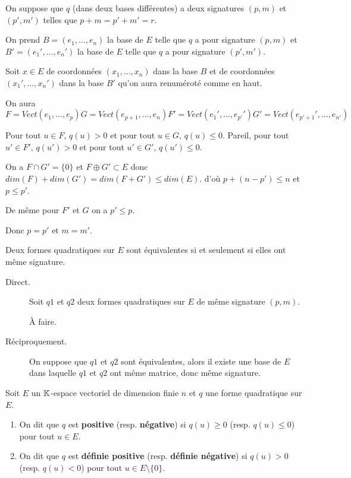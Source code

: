 \documentclass[a4paper, 12pt]{article}
\begin{document}
\begin{demonstration}
    On suppose que $q$ (dans deux bases différentes) a deux signatures $(p, m)$ et $(p', m')$ telles que $p + m = p' + m' = r$.

    On prend $B = (e_1, \ldots, e_n)$ la base de $E$ telle que $q$ a pour signature $(p, m)$ et $B' = (e_1', \ldots, e_n')$ la base de $E$ telle que $q$ a pour signature $(p', m')$.

    Soit $x \in E$ de coordonnées $(x_1, \ldots, x_n)$ dans la base $B$ et de coordonnées $(x_1', \ldots, x_n')$ dans la base $B'$ qu'on aura renuméroté comme en haut.

    On aura
    $$
    F = Vect(e_1, \ldots, e_p)
    G = Vect(e_{p+1}, \ldots, e_{n})
    F' = Vect(e_1', \ldots, e_{p'}')
    G' = Vect(e_{p'+1}', \ldots, e_{n'})
    $$

    Pour tout $u \in F$, $q(u) > 0$ et pour tout $u \in G$, $q(u) \leq 0$.
    Pareil, pour tout $u' \in F'$, $q(u') > 0$ et pour tout $u' \in G'$, $q(u') \leq 0$.

    On a $F \cap G' = \{0\}$ et $F \oplus G' \subset E$ donc $dim(F) + dim(G') = dim(F + G') \leq dim(E)$.
    d'où $p + (n - p') \leq n$ et $p \leq p'$.
    
    De même pour $F'$ et $G$ on a $p' \leq p$.

    Donc $p = p'$ et $m = m'$.
\end{demonstration}

\begin{theoreme}{}{}
    Deux formes quadratiques sur $E$ sont équivalentes si et seulement si elles ont même signature.
\end{theoreme}

\begin{demonstration}
    \begin{description}
        \item[Direct.]
        Soit $q1$ et $q2$ deux formes quadratiques sur $E$ de même signature $(p, m)$.
        \begin{hotwarn}
            À faire.
        \end{hotwarn}
        \item[Réciproquement.]
        On suppose que $q1$ et $q2$ sont équivalentes, alors il existe une base de $E$ dans laquelle $q1$ et $q2$ ont même matrice, donc même signature. 
    \end{description}
\end{demonstration}

\begin{definition}
    Soit $E$ un $\mathbb{K}$-espace vectoriel de dimension finie $n$ et $q$ une forme quadratique sur $E$.

    \begin{enumerate}
        \item 
        On dit que $q$ est \textbf{positive} (resp. \textbf{négative}) si $q(u) \geq 0$ (resp. $q(u) \leq 0$) pour tout $u \in E$.
        \item
        On dit que $q$ est \textbf{définie positive} (resp. \textbf{définie négative}) si $q(u) > 0$ (resp. $q(u) < 0$) pour tout $u \in E \setminus \{0\}$.
    \end{enumerate}
\end{definition}
\end{document}
